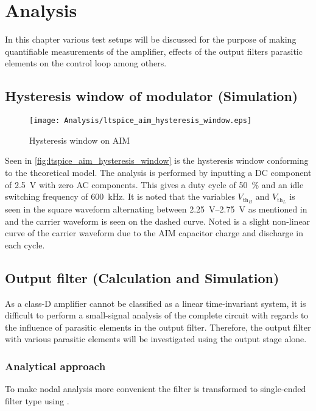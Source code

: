 \chapter[Analysis]{Analysis} \label{cha:Analysis}
In this chapter various test setups will be discussed for the purpose of making quantifiable measurements of the amplifier, effects of the output filters parasitic elements on the control loop among others.

\section{Hysteresis window of modulator (Simulation)}

\begin{figure}[htbp]
	\centering
	\texttt{[image: Analysis/ltspice\_aim\_hysteresis\_window.eps]}
	\caption{Hysteresis window on AIM}
	\label{fig:ltspice_aim_hysteresis_window}
\end{figure}
Seen in \autoref{fig:ltspice_aim_hysteresis_window} is the hysteresis window conforming to the theoretical model. The analysis is performed by inputting a DC component of \SI{2.5}{\volt} with zero AC components. This gives a duty cycle of \SI{50}{\percent} and an idle switching frequency of \SI{600}{\kilo\hertz}. It is noted that the variables $V_{\mathrm{th}_{H}}$ and $V_{\mathrm{th}_{L}}$ is seen in the square waveform alternating between \SIrange{2.25}{2.75}{\volt} as mentioned in  and the carrier waveform is seen on the dashed curve. Noted is a slight non-linear curve of the carrier waveform due to the AIM capacitor charge and discharge in each cycle.

\section{Output filter (Calculation and Simulation)}
As a class-D amplifier cannot be classified as a linear time-invariant system, it is difficult to perform a small-signal analysis of the complete circuit with regards to the influence of parasitic elements in the output filter. Therefore, the output filter with various parasitic elements will be investigated using the output stage alone.

\subsection{Analytical approach}
To make nodal analysis more convenient the filter is transformed to single-ended filter type using . 
\begin{figure}[htbp]
	\centering
	\begin{circuitikz}
		
	\end{circuitikz}
	\label{fig:analysis_single_ended_lp_filter}
\end{figure}

